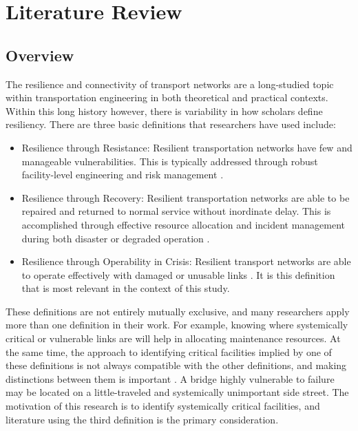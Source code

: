 \chapter{Literature Review}
\label{chp:chapter2}
\graphicspath{{figures/}{figures/chapter2/}}

\section{Overview}

The resilience and connectivity of transport networks are a long-studied
topic within
transportation engineering in both theoretical and practical contexts.
Within this long history
however, there is variability in how scholars define resiliency. There are
three basic
definitions that researchers have used include:

\begin{itemize}
	\item Resilience through Resistance: Resilient transportation networks
	have few and manageable vulnerabilities. This is typically addressed
	through robust facility-level engineering and risk management
	\citep{bradley2007, peeta2010}.
	\item Resilience through Recovery: Resilient transportation networks are
	able to be repaired and returned to normal service without inordinate
	delay. This is accomplished through effective resource allocation and
	incident management during both disaster or degraded operation
	\citep{zhang2016}.
	\item Resilience through Operability in Crisis: Resilient transport
	networks are able to operate effectively with damaged or unusable links
	\citep{berdica2002, ip2011}.
	It is this definition that is most relevant in the context of this study.
\end{itemize}

These definitions are not entirely mutually exclusive, and many
researchers apply more than one
definition in their work. For example, knowing where systemically critical
or vulnerable links
are will help in allocating maintenance resources. At the same time, the
approach to identifying
critical facilities implied by one of these definitions is not always
compatible with the other
definitions, and making distinctions between them is important
\citep{rogers2012}. A bridge
highly vulnerable to failure may be located on a little-traveled and
systemically unimportant
side street. The motivation of this research is to identify systemically
critical facilities, and literature using the third definition is the primary consideration.

